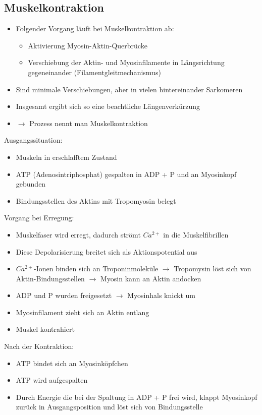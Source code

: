 \documentclass[a4paper,10pt,oneside]{article}
\begin{document}
\subsection{Muskelkontraktion}
\begin{itemize}
	\item Folgender Vorgang läuft bei Muskelkontraktion ab:
		\begin{itemize}
			\item Aktivierung Myosin-Aktin-Querbrücke
			\item Verschiebung der Aktin- und Myosinfilamente in Längsrichtung gegeneinander (Filamentgleitmechanismus)
		\end{itemize}
	\item Sind minimale Verschiebungen, aber in vielen hintereinander Sarkomeren
	\item Insgesamt ergibt sich so eine beachtliche Längenverkürzung
	\item $\rightarrow$ Prozess nennt man Muskelkontraktion
\end{itemize}

Ausgangssituation:
	\begin{itemize}
		\item Muskeln in erschlafftem Zustand
		\item ATP (Adenosintriphosphat) gespalten in ADP + P und an Myosinkopf gebunden
		\item Bindungsstellen des Aktins mit Tropomyosin belegt
	\end{itemize}

Vorgang bei Erregung:
	\begin{itemize}
		\item Muskelfaser wird erregt, dadurch strömt $Ca^{2+}$ in die Muskelfibrillen
		\item Diese Depolarisierung breitet sich als Aktionspotential aus
		\item $Ca^{2+}$-Ionen binden sich an Troponinmoleküle $\rightarrow$ Tropomysin löst sich von Aktin-Bindungsstellen $\rightarrow$ Myosin kann an Aktin andocken
		\item ADP und P wurden freigesetzt $\rightarrow$ Myosinhals knickt um
		\item Myosinfilament zieht sich an Aktin entlang
		\item Muskel kontrahiert
	\end{itemize}

Nach der Kontraktion:
	\begin{itemize}
		\item ATP bindet sich an Myosinköpfchen
		\item ATP wird aufgespalten
		\item Durch Energie die bei der Spaltung in ADP + P frei wird, klappt Myosinkopf zurück in Ausgangsposition und löst sich von Bindungsstelle
	\end{itemize}
	
\end{document}
